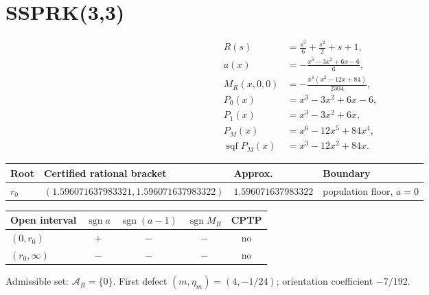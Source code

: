 \documentclass[11pt]{article}
\begin{document}
\section{SSPRK(3,3)}
\begin{align*}
R(s)&=\frac{s^{3}}{6} + \frac{s^{2}}{2} + s + 1,\\
a(x)&=- \frac{x^{3} - 3 x^{2} + 6 x - 6}{6},\\
M_R(x,0,0)&=- \frac{x^{4} \left(x^{2} - 12 x + 84\right)}{2304},\\
P_0(x)&=x^{3}-3 x^{2}+6 x-6,\\
P_1(x)&=x^{3}-3 x^{2}+6 x,\\
P_M(x)&=x^{6}-12 x^{5}+84 x^{4},\\
\operatorname{sqf}P_M(x)&=x^{3}-12 x^{2}+84 x.
\end{align*}
\begin{center}
\begin{tabular}{@{}llll@{}}
\toprule
Root & Certified rational bracket & Approx. & Boundary \\
\midrule
$r_0$ & $(1.596071637983321,1.596071637983322)$ & $1.596071637983322$ & population floor, $a=0$ \\
\bottomrule
\end{tabular}
\end{center}
\begin{center}
\begin{tabular}{@{}lcccc@{}}
\toprule
Open interval & $\operatorname{sgn}a$ & $\operatorname{sgn}(a-1)$ & $\operatorname{sgn}M_R$ & CPTP \\
\midrule
$(0,r_0)$ & $+$ & $-$ & $-$ & no \\
$(r_0,\infty)$ & $-$ & $-$ & $-$ & no \\
\bottomrule
\end{tabular}
\end{center}
Admissible set: $\mathcal A_R=\{0\}$. First defect $(m,\eta_m)=(4,-1/24)$; orientation coefficient $-7/192$.
\end{document}
